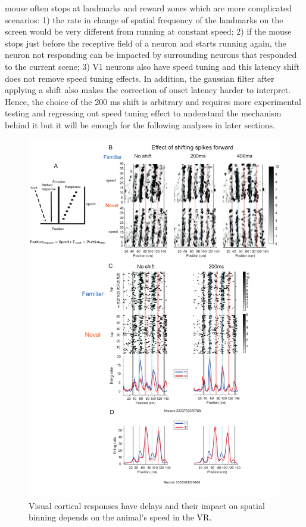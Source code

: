 mouse often stops at landmarks and reward zones which are more complicated scenarios: 1) the rate in change of spatial frequency of the landmarks on the screen would be very different from running at constant speed; 2) if the mouse stops just before the receptive field of a neuron and starts running again, the neuron not responding can be impacted by surrounding neurons that responded to the current scene; 3) V1 neurons also have speed tuning and this latency shift does not remove speed tuning effects. In addition, the gaussian filter after applying a shift also makes the correction of onset latency harder to interpret. Hence, the choice of the 200 ms shift is arbitrary and requires more experimental testing and regressing out speed tuning effect to understand the mechanism behind it but it will be enough for the following analyses in later sections.
\begin{figure}
    \centering
    \includegraphics[width=1\linewidth]{figures//Chapter 4 V1/fig2_speed_impact.pdf}
    \caption{Visual cortical responses have delays and their impact on spatial binning depends on the animal's speed in the VR. }
    \label{fig:placeholder}
\end{figure}

